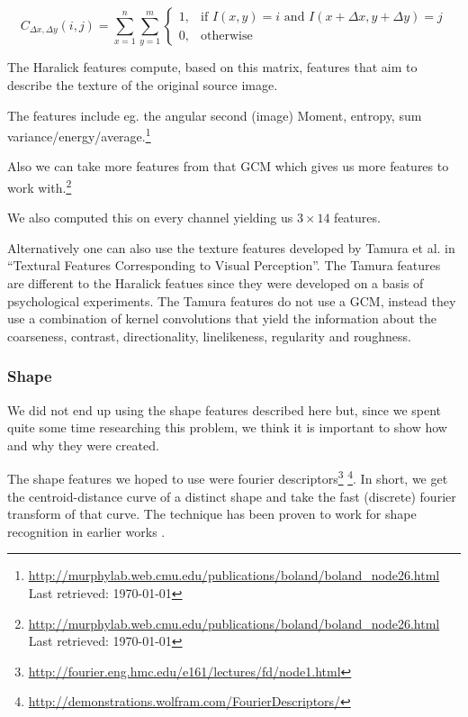 \documentclass[journal]{vgtc}       %
\begin{document}
\[{\displaystyle C_{\Delta x,\Delta y}(i,j)=\sum _{x=1}^{n}\sum _{y=1}^{m}{\begin{cases}1,&{\text{if }}I(x,y)=i{\text{ and }}I(x+\Delta x,y+\Delta y)=j\\0,&{\text{otherwise}}\end{cases}}}\]

The Haralick features compute, based on this matrix, features that aim to describe the texture of the original source image.

The features include eg. the angular second (image) Moment, entropy, sum variance/energy/average.\footnote{\url{http://murphylab.web.cmu.edu/publications/boland/boland_node26.html} \\ Last retrieved: \today}

Also we can take more features from that GCM which gives us more features to work with.\footnote{\url{http://murphylab.web.cmu.edu/publications/boland/boland_node26.html} \\ Last retrieved: \today}

We also computed this on every channel yielding us \(3 \times 14 \) features.

Alternatively one can also use the  texture features developed by Tamura et al.  in ``Textural Features Corresponding to Visual Perception''\cite{tamura}. The Tamura features are different to the Haralick featues since they were developed on a basis of psychological experiments. The Tamura features do not use a GCM, instead they use a combination of kernel convolutions that yield  the information about the coarseness, contrast, directionality, linelikeness, regularity and roughness.

\subsubsection{Shape}
We did not end up using the shape features described here but, since we spent quite some time researching this problem, we think it is important to show how and why they were created.

The shape features we hoped to use were  fourier descriptors\footnote{\url{http://fourier.eng.hmc.edu/e161/lectures/fd/node1.html} } \footnote{\url{http://demonstrations.wolfram.com/FourierDescriptors/}}. In short, we get the centroid-distance curve of a distinct shape and take the fast (discrete) fourier transform of that curve. The technique has been proven to work for shape recognition  in earlier works \cite{fourierd}.  
\end{document}
